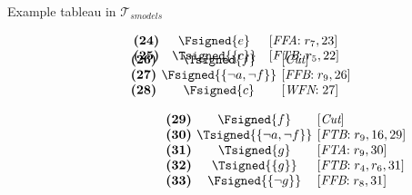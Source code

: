 \begin{frame}{Example tableau in $\mathcal{T}_{\textit{smodels}}$}
\begin{center}
\begin{minipage}[t]{16cm}
\begin{minipage}[t]{6cm}
\[\begin{array}{lcl}
\textbf{(24)}                                      &
  \Fsigned{e}                                      &
  [\textit{FFA}{:}\;r_7, \text{23}]                \\
\textbf{(25)}                                      &
  \Tsigned{\{c\}}                                  &
  [\textit{FTB}{:}\;r_5, \text{22}]
\vspace{-0.7cm}
\end{array}
\]
%
\begin{minipage}[t]{1cm}
\[
\hspace{0.25cm}
\begin{array}{l@{~~}c@{~~}l}
\textbf{(26)}                                      &
  \Tsigned{f}                                      &
  [\textit{Cut}]                                   \\
\textbf{(27)}                                      & \hspace{-0.1cm}
  \Fsigned{\{\neg a,\neg f\}}      \hspace{-0.1cm} &
  [\textit{FFB}{:}\;r_9, \text{26}]                \\
\textbf{(28)}                                      &
  \Fsigned{c}                                      &
  [\textit{WFN}{:}\;\text{27}]
\end{array}
\]
\end{minipage}
%
\begin{minipage}[t]{2cm}
\[
\hspace{2.75cm}
\begin{array}{l@{~~}c@{~~}l}
\textbf{(29)}                                      &
  \Fsigned{f}                                      &
  [\textit{Cut}]                                   \\
\textbf{(30)}                                      & \hspace{-0.1cm}
  \Tsigned{\{\neg a,\neg f\}}      \hspace{-0.1cm} &
  [\textit{FTB}{:}\;r_9, \text{16}, \text{29}]     \\
\textbf{(31)}                                      &
  \Tsigned{g}                                      &
  [\textit{FTA}{:}\;r_9, \text{30}]                \\
\textbf{(32)}                                      &
  \Tsigned{\{g\}}                                  &
  [\textit{FTB}{:}\;r_4, r_6, \text{31}]           \\
\textbf{(33)}                                      &
  \Fsigned{\{\neg g\}}                     &
  [\textit{FFB}{:}\;r_8, \text{31}]
\end{array}
\]
\end{minipage}
\end{minipage}
\end{minipage}
\end{center}
\end{frame}
